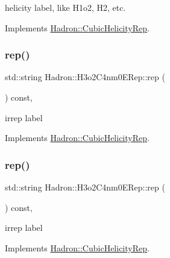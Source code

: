 helicity label, like H1o2, H2, etc. 

Implements \mbox{\hyperlink{structHadron_1_1CubicHelicityRep_af1096946b7470edf0a55451cc662f231}{Hadron\+::\+Cubic\+Helicity\+Rep}}.

\mbox{\label{structHadron_1_1H3o2C4nm0ERep_aba80c4eba2c70fb467683c3ea8d67aa8}} 
\subsubsection{\texorpdfstring{rep()}{rep()}\hspace{0.1cm}{\footnotesize\ttfamily [1/2]}}
{\footnotesize\ttfamily std\+::string Hadron\+::\+H3o2\+C4nm0\+E\+Rep\+::rep (\begin{DoxyParamCaption}{ }\end{DoxyParamCaption}) const\hspace{0.3cm}{\ttfamily [inline]}, {\ttfamily [virtual]}}

irrep label 

Implements \mbox{\hyperlink{structHadron_1_1CubicHelicityRep_a8cdd86f068a167dc96faef02bfb8a33d}{Hadron\+::\+Cubic\+Helicity\+Rep}}.

\mbox{\label{structHadron_1_1H3o2C4nm0ERep_aba80c4eba2c70fb467683c3ea8d67aa8}} 
\subsubsection{\texorpdfstring{rep()}{rep()}\hspace{0.1cm}{\footnotesize\ttfamily [2/2]}}
{\footnotesize\ttfamily std\+::string Hadron\+::\+H3o2\+C4nm0\+E\+Rep\+::rep (\begin{DoxyParamCaption}{ }\end{DoxyParamCaption}) const\hspace{0.3cm}{\ttfamily [inline]}, {\ttfamily [virtual]}}

irrep label 

Implements \mbox{\hyperlink{structHadron_1_1CubicHelicityRep_a8cdd86f068a167dc96faef02bfb8a33d}{Hadron\+::\+Cubic\+Helicity\+Rep}}.

\mbox{\label{structHadron_1_1H3o2C4nm0ERep_a02b0a0895d49ca7a0dd5aa6cdacc877e}} 
